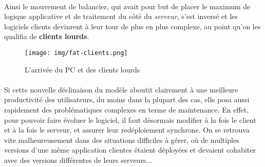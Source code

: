 {  \paragraph{} Ainsi le mouvement de balancier, qui avait pour but de placer le maximum de logique
  applicative et de traitement du côté du \textit{serveur}, s'est inversé et les logiciels clients
  devinrent à leur tour de plus en plus complexe, au point qu'on les qualifia de \textbf{clients
  lourds}.

  \begin{figure}[h]
    \begin{center}
      \texttt{[image: img/fat-clients.png]}
      \caption{L'arrivée du PC et des clients lourds}
      \label{fat-clients}
    \end{center}
  \end{figure}


  \paragraph{} Si cette nouvelle déclinaison du modèle aboutit clairement à une meilleure productivité
  des utilisateurs, du moins dans la plupart des cas, elle posa aussi rapidement des problématiques
  complexes en terme de maintenance. En effet, pour pouvoir faire évoluer le logiciel, il faut
  désormais modifier à la fois le client et à la fois le serveur, et assurer leur redéploiement
  synchrone. On se retrouva vite malheureusement dans des situations difficiles à gérer, où de
  multiples versions d'une même application clientes étaient déployées et devaient cohabiter avec des
  versions différentes de leurs serveurs...
}





